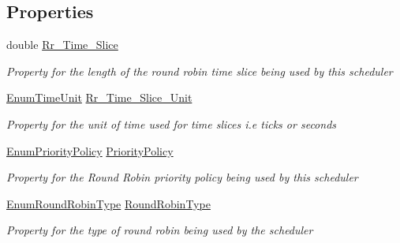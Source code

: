 \subsection*{Properties}
\begin{DoxyCompactItemize}
\item 
double \hyperlink{class_c_p_u___o_s___simulator_1_1_operating___system_1_1_o_s_core_af72424eea15d262a41f9390e8f3bce97}{Rr\+\_\+\+Time\+\_\+\+Slice}
\begin{DoxyCompactList}\small\item\em Property for the length of the round robin time slice being used by this scheduler \end{DoxyCompactList}\item 
\hyperlink{namespace_c_p_u___o_s___simulator_1_1_operating___system_a0553d0bc2513aec52caa769acf994d5c}{Enum\+Time\+Unit} \hyperlink{class_c_p_u___o_s___simulator_1_1_operating___system_1_1_o_s_core_a8f8e6705ddbf4a04900b343e65bd71d2}{Rr\+\_\+\+Time\+\_\+\+Slice\+\_\+\+Unit}
\begin{DoxyCompactList}\small\item\em Property for the unit of time used for time slices i.\+e ticks or seconds \end{DoxyCompactList}\item 
\hyperlink{namespace_c_p_u___o_s___simulator_1_1_operating___system_a3a9286a473bd079e9c65908c0378fa00}{Enum\+Priority\+Policy} \hyperlink{class_c_p_u___o_s___simulator_1_1_operating___system_1_1_o_s_core_a71b8f167c84a1cb1feba77cd2cb5420d}{Priority\+Policy}
\begin{DoxyCompactList}\small\item\em Property for the Round Robin priority policy being used by this scheduler \end{DoxyCompactList}\item 
\hyperlink{namespace_c_p_u___o_s___simulator_1_1_operating___system_a4c7effb8b6725df52018a3a14cede96e}{Enum\+Round\+Robin\+Type} \hyperlink{class_c_p_u___o_s___simulator_1_1_operating___system_1_1_o_s_core_a49d248bc5438438d42482a9e962c417c}{Round\+Robin\+Type}
\begin{DoxyCompactList}\small\item\em Property for the type of round robin being used by the scheduler \end{DoxyCompactList}\item 

\end{DoxyCompactItemize}
